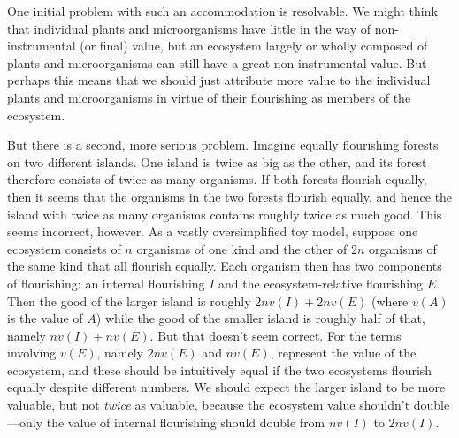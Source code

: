 One initial problem with such an accommodation is resolvable. We might think that individual plants and microorganisms 
have little in the way of non-instrumental (or final) value, but an ecosystem largely or wholly composed of plants 
and microorganisms can still have a great non-instrumental value. But perhaps this means that we should just 
attribute more value 
to the individual plants and microorganisms in virtue of their flourishing as members of the ecosystem.

But there is a second, more serious problem. Imagine equally flourishing forests on two different islands. 
One island is twice as big as the other, and its forest therefore consists of twice as many organisms. If
both forests flourish equally, then it seems that the organisms in the two forests flourish equally, and
hence the island with twice as many organisms contains roughly twice as much good. This seems incorrect, however. 
As a vastly oversimplified toy model, suppose one ecosystem consists of $n$ organisms of one kind and the other of $2n$ organisms
of the same kind that all flourish equally. Each organism then has two components of flourishing: an internal 
flourishing $I$ and the ecosystem-relative flourishing $E$. Then the good of the larger island is roughly
$2n v(I)+2n v(E)$ (where $v(A)$ is the value of $A$) while the good of the smaller island is roughly half of that,
namely $n v(I)+nv(E)$. But that doesn't seem correct. For the terms involving $v(E)$, namely $2n v(E)$ and
$n v(E)$, represent the value of the ecosystem, and these should be intuitively equal if the two ecosystems
flourish equally despite different numbers. We should expect the larger island to be more valuable, but not
\textit{twice} as valuable, because the ecosystem value shouldn't double---only the value of internal
flourishing should double from $nv(I)$ to $2nv(I)$. 

